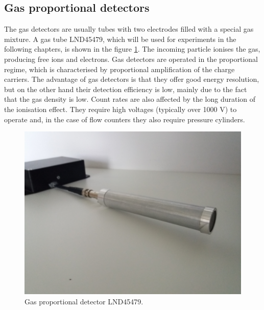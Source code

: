 \subsection{Gas proportional detectors}
The gas detectors are usually tubes with two electrodes filled with a special gas mixture. A gas tube LND45479, which  will be used for experiments in the following chapters, is shown in the figure \ref{gas}. The incoming particle ionises the gas, producing free ions and electrons. Gas detectors are operated in the proportional regime, which is characterised by proportional amplification of the charge carriers. The advantage of gas detectors is that they offer good energy resolution, but on the other hand their detection efficiency is low, mainly due to the fact that the gas density is low. Count rates are also affected by the long duration of the ionisation effect. They require high voltages (typically over 1000 V) to operate and, in the case of flow counters they also require pressure cylinders.

\begin{figure}[H]
 \centering
\includegraphics[scale=0.1, angle = 0]{./pictures/GasTube.jpg}
 \caption{Gas proportional detector LND45479.}
 \label{gas}
 
\end{figure}


